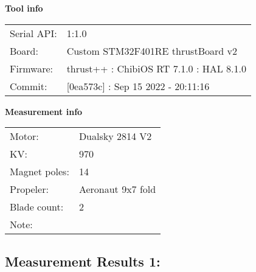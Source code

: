 \documentclass[10pt]{article}
\begin{document}
\noindent
{\large \bf Tool info}
\vspace{3mm}

\noindent
\begin{tabular}{ll}
Serial API:  & 1:1.0\\ 
Board:       & Custom STM32F401RE thrustBoard v2\\ 
Firmware:    & thrust++ : ChibiOS RT 7.1.0 : HAL 8.1.0\\ 
Commit:      & [0ea573c] : Sep 15 2022 - 20:11:16
\end{tabular}
\vspace{3mm}

\noindent
{\large \bf Measurement info}
\vspace{3mm}

\noindent
\begin{tabular}{ll}
Motor:        & Dualsky 2814 V2\\ 
KV:           & 970\\ 
Magnet poles: & 14\\ 
Propeler:     & Aeronaut 9x7 fold \\ 
Blade count:  & 2\\ 
Note:         & 
\end{tabular}

\vspace{3mm}


\subsection*{\large \bf Measurement Results 1:}
\end{document}
